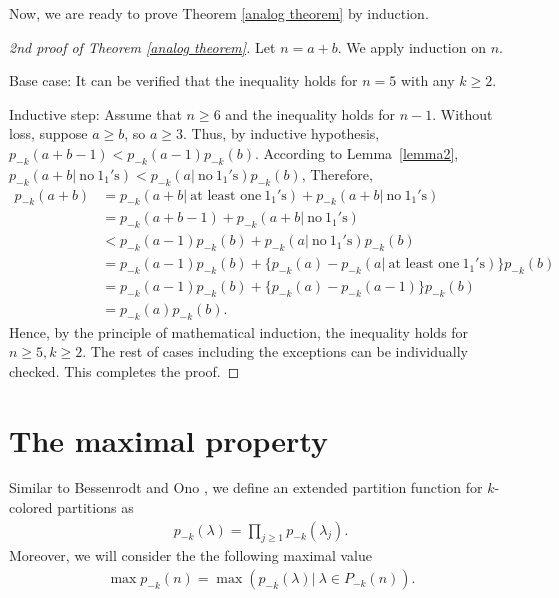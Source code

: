 \documentclass[12pt,reqno]{amsart}
\numberwithin{equation}{section}
\theoremstyle{plain}
\theoremstyle{definition}
\begin{document}
Now, we are ready to prove Theorem \ref{analog theorem} by induction.
\begin{proof}[2nd proof of Theorem \ref{analog theorem}]
Let $n=a+b$. We apply induction on $n$.

Base case: It can be verified that the inequality holds for $n=5$ with any $k\ge 2$.

Inductive step: Assume that $n\geq 6$ and the inequality holds for $n-1$. Without loss, suppose $a\geq b$, so $a\ge 3$. Thus, by inductive hypothesis, $p_{-k}(a+b-1)<p_{-k}(a-1)p_{-k}(b)$. According to Lemma~\ref{lemma2}, $p_{-k}(a+b|~\textrm{no}~1_{1}'\textrm{s})<p_{-k}(a|~\textrm{no}~1_{1}'\textrm{s})p_{-k}(b)$, Therefore,
\begin{align*}
p_{-k}(a+b) &=p_{-k}(a+b|~\textrm{at~least~one}~1_{1}'\textrm{s})+p_{-k}(a+b|~\textrm{no}~1_{1}'\textrm{s})\\
 &=p_{-k}(a+b-1)+p_{-k}(a+b|~\textrm{no}~1_{1}'\textrm{s})\\
 &<p_{-k}(a-1)p_{-k}(b)+p_{-k}(a|~\textrm{no}~1_{1}'\textrm{s})p_{-k}(b)\\
 &=p_{-k}(a-1)p_{-k}(b)+\{p_{-k}(a)-p_{-k}(a|~\textrm{at~least~one}~1_{1}'\textrm{s})\}p_{-k}(b)\\
 &=p_{-k}(a-1)p_{-k}(b)+\{p_{-k}(a)-p_{-k}(a-1)\}p_{-k}(b)\\
 &=p_{-k}(a)p_{-k}(b).
\end{align*}
Hence, by the principle of mathematical induction, the inequality holds for $n\geq5, k\ge 2$. The rest of cases including the exceptions can be individually checked. This completes the proof.
\end{proof}


\section{The maximal property}\label{sect:max property}
Similar to Bessenrodt and Ono \cite{BO2016}, we define an extended partition function for $k$-colored partitions as
\begin{align*}
p_{-k}(\lambda)=\prod_{j\geq1}p_{-k}(\lambda_{j}).
\end{align*}
Moreover, we will consider the the following maximal value
\begin{align*}
\max p_{-k}(n)=\max \left(p_{-k}(\lambda)|~\lambda\in P_{-k}(n)\right).
\end{align*}
\end{document}
